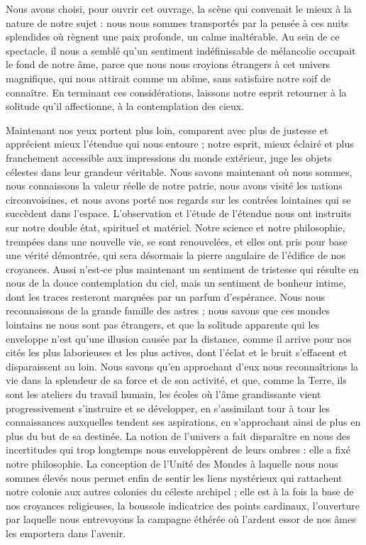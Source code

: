 \documentclass[a4paper, 11pt, oneside]{article}
\begin{document}
Nous avons choisi, pour ouvrir cet ouvrage, la scène qui convenait le mieux à la nature de notre sujet : nous nous sommes transportés par la pensée à ces nuits splendides où règnent une paix profonde, un calme inaltérable. Au sein de ce spectacle, il nous a semblé qu'un sentiment indéfinissable de mélancolie occupait le fond de notre âme, parce que nous nous croyions étrangers à cet univers magnifique, qui nous attirait comme un abîme, sans satisfaire notre soif de connaître. En terminant ces considérations, laissons notre esprit retourner à la solitude qu'il affectionne, à la contemplation des cieux.

Maintenant nos yeux portent plus loin, comparent avec plus de justesse et apprécient mieux l'étendue qui nous entoure ; notre esprit, mieux éclairé et plus franchement accessible aux impressions du monde extérieur, juge les objets célestes dans leur grandeur véritable. Nous savons maintenant où nous sommes, nous connaissons la valeur réelle de notre patrie, nous avons visité les nations circonvoisines, et nous avons porté nos regards sur les contrées lointaines qui se succèdent dans l'espace. L'observation et l'étude de l'étendue nous ont instruits sur notre double état, spirituel et matériel. Notre science et notre philosophie, trempées dans une nouvelle vie, se sont renouvelées, et elles ont pris pour base une vérité démontrée, qui sera désormais la pierre angulaire de l'édifice de nos croyances. Aussi n'est-ce plus maintenant un sentiment de tristesse qui résulte en nous de la douce contemplation du ciel, mais un sentiment de bonheur intime, dont les traces resteront marquées par un parfum d'espérance. Nous nous reconnaissons de la grande famille des astres ; nous savons que ces mondes lointains ne nous sont pas étrangers, et que la solitude apparente qui les enveloppe n'est qu'une illusion causée par la distance, comme il arrive pour nos cités les plus laborieuses et les plus actives, dont l'éclat et le bruit s'effacent et disparaissent au loin. Nous savons qu'en approchant d'eux nous reconnaîtrions la vie dans la splendeur de sa force et de son activité, et que, comme la Terre, ils sont les ateliers du travail humain, les écoles où l'âme grandissante vient progressivement s'instruire et se développer, en s'assimilant tour à tour les connaissances auxquelles tendent ses aspirations, en s'approchant ainsi de plus en plus du but de sa destinée. La notion de l'univers a fait disparaître en nous des incertitudes qui trop longtemps nous enveloppèrent de leurs ombres : elle a fixé notre philosophie. La conception de l'Unité des Mondes à laquelle nous nous sommes élevés nous permet enfin de sentir les liens mystérieux qui rattachent notre colonie aux autres colonies du céleste archipel ; elle est à la fois la base de nos croyances religieuses, la boussole indicatrice des points cardinaux, l'ouverture par laquelle nous entrevoyons la campagne éthérée où l'ardent essor de nos âmes les emportera dans l'avenir.
\end{document}

